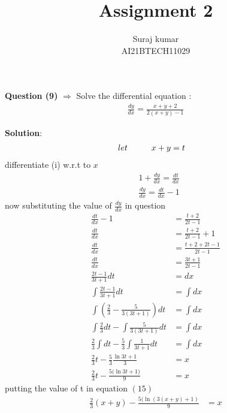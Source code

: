 \documentclass[journal,12pt,twocolumn]{IEEEtran}
\title{Assignment 2}
\author{Suraj kumar \\ \normalsize AI21BTECH11029 \\}
\begin{document}
\maketitle
\textbf{Question (9)} $\Rightarrow$ Solve the differential equation :
  \begin{align}
  \frac{dy}{dx}=\frac{x+y+2}{2(x+y)-1}
  \end{align}
  
\textbf{Solution}:
\begin{align}
let \hspace{10mm} &x+y=t
\end{align}
 differentiate (i) w.r.t to $x$
 \begin{align}
 	& 1+\frac{dy}{dx}=\frac{dt}{dx}\\
  	& \frac{dy}{dx}=\frac{dt}{dx}-1
 \end{align}
now substituting the value of $\frac{dy}{dx}$ in question
\begin{align}
	\frac{dt}{dx}-1&=\frac{t+2}{2t-1}\\
	\frac{dt}{dx}&=\frac{t+2}{2t-1}+1\\
	\frac{dt}{dx}&=\frac{t+2+2t-1}{2t-1}\\
	\frac{dt}{dx}&=\frac{3t+1}{2t-1}\\	
	\frac{2t-1}{3t+1}dt&=dx\\	
	\int \frac{2t-1}{3t+1}dt&=\int dx\\
	\int \left( \frac{2}{3}-\frac{5}{3(3t+1)} \right)dt&=\int dx\\
	\int \frac{2}{3}dt- \int \frac{5}{3(3t+1)}dt&=\int dx\\
	\frac{2}{3}\int dt-\frac{5}{3} \int \frac{1}{3t+1}dt&=\int dx\\
	\frac{2}{3} t-\frac{5}{3}\frac{\ln{3t+1}}{3}&=x\\
	\frac{2}{3} t-\frac{5(\ln{3t+1)}}{9}&=x
\end{align}
putting the value of t in equation $(15)$
\begin{align}
\frac{2}{3}(x+y)-\frac{5(\ln(3(x+y)+1)}{9}&=x
\end{align}
\end{document}
